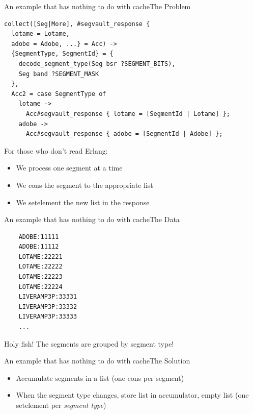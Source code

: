 \documentclass[10pt,xcolor=dvipsnames]{beamer}
\begin{document}
\begin{frame}[t,fragile]{An example that has nothing to do with cache}{The Problem}
  \begin{lstlisting}
collect([Seg|More], #segvault_response {
  lotame = Lotame,
  adobe = Adobe, ...} = Acc) ->
  {SegmentType, SegmentId} = {
    decode_segment_type(Seg bsr ?SEGMENT_BITS),
    Seg band ?SEGMENT_MASK
  },
  Acc2 = case SegmentType of
    lotame ->
      Acc#segvault_response { lotame = [SegmentId | Lotame] };
    adobe ->
      Acc#segvault_response { adobe = [SegmentId | Adobe] };
    \end{lstlisting}
    For those who don't read Erlang:
    \begin{itemize}
      \item We process one segment at a time
      \item We cons the segment to the appropriate list
      \item We setelement the new list in the response
    \end{itemize}
\end{frame}

\begin{frame}[fragile]{An example that has nothing to do with cache}{The Data}
  \begin{lstlisting}
    ADOBE:11111
    ADOBE:11112
    LOTAME:22221
    LOTAME:22222
    LOTAME:22223
    LOTAME:22224
    LIVERAMP3P:33331
    LIVERAMP3P:33332
    LIVERAMP3P:33333
    ...
  \end{lstlisting}
  \vskip 1cm
  Holy fish! The segments are grouped by segment type!
\end{frame}

\begin{frame}[fragile]{An example that has nothing to do with cache}{The Solution}
  \begin{itemize}
    \item Accumulate segments in a list (one cons per segment)
    \item When the segment type changes, store list in accumulator, empty list (one setelement per \emph{segment type})
  \end{itemize}
\end{frame}
\end{document}
